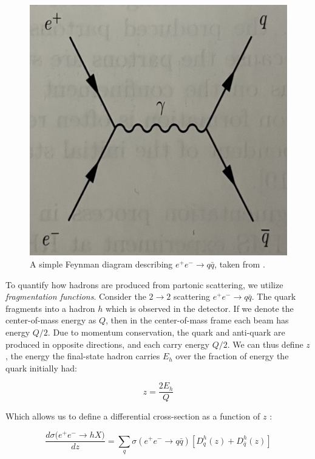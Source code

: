 \documentclass[../main.tex]{subfiles}
\begin{document}
\begin{figure}[h]
    \centering
    \includegraphics[scale=0.5]{introduction/figs/elecpos.jpeg}
    \caption{A simple Feynman diagram describing $e^+e^- \rightarrow q\bar{q}$, taken from \cite{Vogt:2007zz}.}
    \label{fig:elecpos}
\end{figure}

To quantify how hadrons are produced from partonic scattering, we utilize \textit{fragmentation functions}. Consider the $2 \rightarrow 2$ scattering $e^+e^- \rightarrow q \bar{q}$. The quark fragments into a hadron $h$ which is observed in the detector. If we denote the center-of-mass energy as $Q$, then in the center-of-mass frame each beam has energy $Q/2$. Due to momentum conservation, the quark and anti-quark are produced in opposite directions, and each carry energy $Q/2$. We can thus define $z$, the energy the final-state hadron carries $E_h$ over the fraction of energy the quark initially had:

\begin{equation}
    z = \frac{2 E_h}{Q}
\end{equation}

Which allows us to define a differential cross-section as a function of $z$ \cite{Vogt:2007zz}:

\begin{equation}
    \frac{d\sigma{(e^+e^- \rightarrow hX})}{dz} = \sum_q \sigma(e^+e^- \rightarrow q\bar{q})[D_q^h(z) + D_{\bar{q}}^h(z)]
\end{equation}
\end{document}
